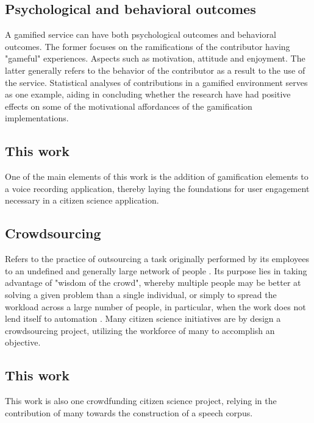 \subsection{Psychological and behavioral outcomes}

A gamified service can have both psychological outcomes and behavioral outcomes. The former focuses on the ramifications of the contributor having "gameful" experiences. Aspects such as motivation, attitude and enjoyment. The latter generally refers to the behavior of the contributor as a result to the use of the service. Statistical analyses of contributions in a gamified environment serves as one example, aiding in concluding whether the research have had positive effects on some of the motivational affordances of the gamification implementations.

\subsection{This work}

One of the main elements of this work is the addition of gamification elements to a voice recording application, thereby laying the foundations for user engagement necessary in a citizen science application.

\subsection{Crowdsourcing}

Refers to the practice of outsourcing a task originally performed by its employees to an undefined and generally large network of people \cite{howe2006rise}. Its purpose lies in taking advantage of "wisdom of the crowd", whereby multiple people may be better at solving a given problem than a single individual, or simply to spread the workload across a large number of people, in particular, when the work does not lend itself to automation \cite{kreitmair2019citizen}. Many citizen science initiatives are by design a crowdsourcing project, utilizing the workforce of many to accomplish an objective.

\subsection{This work}

This work is also one crowdfunding citizen science project, relying in the contribution of many towards the construction of a speech corpus.

